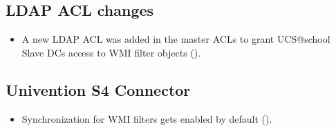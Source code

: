 \subsection{LDAP ACL changes}
\begin{itemize}
\item A new LDAP ACL was added in the master ACLs to grant UCS@school Slave DCs access to WMI filter objects ().
\end{itemize}
 




\subsection{Univention S4 Connector}
\begin{itemize}
\item Synchronization for WMI filters gets enabled by default ().
\end{itemize}


